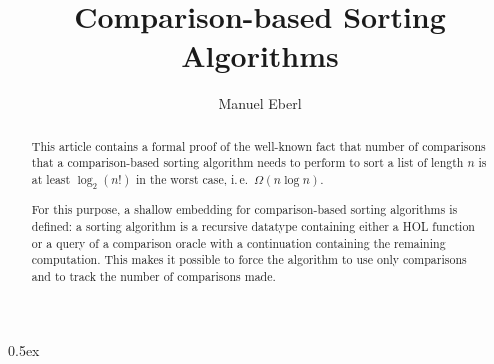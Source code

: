 \documentclass[11pt,a4paper]{article}
\begin{document}
\title{Comparison-based Sorting Algorithms}
\author{Manuel Eberl}
\maketitle

\begin{abstract}
This article contains a formal proof of the well-known fact that number of comparisons that a comparison-based sorting algorithm needs to perform to sort a list of length $n$ is at least $\log_2 (n!)$ in the worst case, i.\,e.\ $\Omega(n \log n)$.

For this purpose, a shallow embedding for comparison-based sorting algorithms is defined: a sorting algorithm is a recursive datatype containing either a HOL function or a query of a comparison oracle with a continuation containing the remaining computation. This makes it possible to force the algorithm to use only comparisons and to track the number of comparisons made.
\end{abstract}

\tableofcontents
\newpage
\parindent 0pt\parskip 0.5ex





\end{document}
